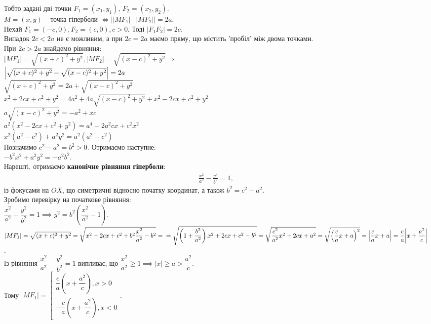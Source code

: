 \documentclass[a4paper, 10pt]{extarticle}
\theoremstyle{theoremdd}
\theoremstyle{theoremdd}
\theoremstyle{theoremdd}
\theoremstyle{theoremdd}
\theoremstyle{theoremdd}
\theoremstyle{theoremdd}
\theoremstyle{theoremdd}
\theoremstyle{theoremdd}
\begin{document}
Тобто задані дві точки $F_1 = (x_1,y_1)$, $F_2 = (x_2,y_2)$.\\
$M = (x,y)$ -- точка гіперболи $\iff ||MF_1|-|MF_2|| = 2a$.
\bigskip \\
Нехай $F_1 = (-c,0), F_2 = (c,0), c>0$. Тоді $|F_1F_2| = 2c$.\\
Випадок $2c<2a$ не є можливим, а при $2c = 2a$ маємо пряму, що містить 'пробіл' між двома точками.\\
При $2c>2a$ знайдемо рівняння:\\
$|MF_1|=\sqrt{(x+c)^2+y^2}, |MF_2|=\sqrt{(x-c)^2+y^2} \Rightarrow$\\
$\abs{\sqrt{(x+c)^2+y^2}-\sqrt{(x-c)^2+y^2}}=2a$\\
$\sqrt{(x+c)^2+y^2} = 2a + \sqrt{(x-c)^2+y^2}$\\
$x^2+2cx+c^2+y^2=4a^2+4a\sqrt{(x-c)^2+y^2}+x^2-2cx+c^2+y^2$\\
$a\sqrt{(x-c)^2+y^2}=-a^2+xc$\\
$a^2(x^2-2cx+c^2+y^2)=a^4-2a^2cx+c^2x^2$\\
$x^2(a^2-c^2)+a^2y^2=a^2(a^2-c^2)$\\
Позначимо $c^2-a^2=b^2>0$. Отримаємо наступне:\\
$-b^2x^2+a^2y^2=-a^2b^2$.\\
Нарешті, отримаємо \textbf{канонічне рівняння гіперболи}:
\begin{align*}
\frac{x^2}{a^2} - \frac{y^2}{b^2} = 1,
\end{align*}
із фокусами на $OX$, що симетричні відносно початку координат, а також $b^2 = c^2 - a^2$.
\bigskip \\
Зробимо перевірку на початкове рівняння:\\
$\dfrac{x^2}{a^2} - \dfrac{y^2}{b^2} = 1 \implies y^2 = b^2 \left(\dfrac{x^2}{a^2} -1 \right)$.\\
$|MF_1| = \sqrt{(x+c)^2+y^2} = \sqrt{x^2+2cx+c^2+b^2\dfrac{x^2}{a^2} - b^2} = \\
= \sqrt{\left(1 + \dfrac{b^2}{a^2} \right)x^2 + 2cx + c^2 - b^2} = \sqrt{\dfrac{c^2}{a^2}x^2 + 2cx + a^2} = \sqrt{\left(\dfrac{c}{a}x + a \right)^2} = \abs{\dfrac{c}{a}x + a} = \dfrac{c}{a} \abs{x + \dfrac{a^2}{c}}$.\\
Із рівняння $\dfrac{x^2}{a^2} - \dfrac{y^2}{b^2} = 1$ випливає, що $\dfrac{x^2}{a^2} \geq 1 \implies |x| \geq a > \dfrac{a^2}{c}$.\\
Тому $|MF_1| = \left[ \begin{gathered} \dfrac{c}{a} \left(x + \dfrac{a^2}{c} \right), x > 0 \\ -\dfrac{c}{a} \left(x + \dfrac{a^2}{c} \right), x < 0 \end{gathered} \right.$.\\
\end{document}
